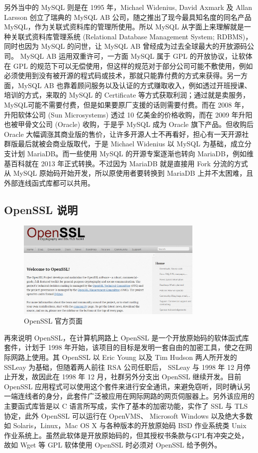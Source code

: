 另外当中的 MySQL 则是在 1995 年，Michael Widenius, David Axmark 及 Allan Larsson 创立了瑞典的 MySQL AB 公司，随之推出了现今最具知名度的同名产品 MySQL，作为关联式资料库的管理所使用。所以 MySQL 从字面上来理解就是一种关联式资料库管理系统 (Relational Database Management System; RDBMS)，同时也因为 MySQL 的问世，让 MySQL AB 曾经成为过去全球最大的开放源码公司。
MySQL AB 运用双重许可，一方面 MySQL 属于 GPL 的开放协议，让软体在 GPL 的规范下可以无偿使用，但这样的规范对于部分公司可能不敷使用，例如必须使用到没有被开源的程式码或技术，那就只能靠付费的方式来获得。另一方面，MySQL AB 也靠着顾问服务以及认证的方式赚取收入，例如透过开班授课、培训的方式，来取的 MySQL 的 Certificate 等方式获取利润；通过就是卖服务，MySQL可能不需要付费，但是如果要原厂支援的话则需要付费。而在 2008 年，升阳软体公司 (Sun Microsystems) 透过 10 亿美金的价格收购，而在 2009 年升阳也被甲骨文公司 (Oracle) 收购，于是乎 MySQL 成为 Oracle 旗下产品。但收购后 Oracle 大幅调涨其商业版的售价，让许多开源人士不再看好，担心有一天开源社群版最后就被会商业版取代，于是 Michael Widenius 以 MySQL 为基础，成立分支计划 MariaDB。而一些使用 MySQL 的开源专案逐渐也转向 MariaDB，例如维基百科就在 2013 年正式转换。不过因为 MariaDB 就是直接用 Fork 分流的方式从 MySQL 原始码开始开发，所以原使用者要转换到 MariaDB 上并不太困难，且外部连线函式库都可以共用。

\subsection{OpenSSL 说明}

\begin{figure}[htb]
\centering 
\includegraphics[width=0.80\textwidth]{img/ch1s2m1.png} 
\caption{OpenSSL 官方页面}
\label{Test}
\end{figure}

再來说明 OpenSSL，在计算机网路上 OpenSSL 是一个开放原始码的软体函式库套件，计划于 1998 年开始，该项目的目标是发明一套自由的加密工具，使之在网际网路上使用。其 OpenSSL 以 Eric Young 以及 Tim Hudson 两人所开发的 SSLeay 为基础，但随着两人前往 RSA 公司任职后， SSLeay 与 1998 年 12 月停止开发，故因此在 1998 年 12 月，社群另外分支出 OpenSSL 继续开发。目前 OpenSSL 应用程式可以使用这个套件来进行安全通讯，来避免窃听，同时确认另一端连线者的身分，此套件广泛被应用在网际网路的网页伺服器上。另外该应用的主要函式库皆是以 C 语言所写成，实作了基本的加密功能，实作了 SSL 与 TLS 协定，此外 OpenSSL 可以运行在 OpenVMS、 Microsoft Windows 以及绝大多数如 Solaris，Linux，Mac OS X 与各种版本的开放原始码 BSD 作业系统类 Unix 作业系统上。虽然此软体是开放原始码的，但其授权书条款与GPL有冲突之处，故如 Wget 等 GPL 软体使用 OpenSSL 时必须对 OpenSSL 给予例外。

